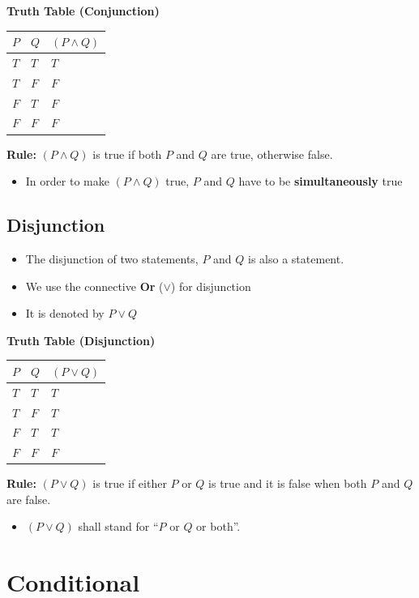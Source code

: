 \documentclass[]{book}
\providecommand{\tightlist}{%
  \setlength{\itemsep}{0pt}\setlength{\parskip}{0pt}}
\begin{document}
\textbf{Truth Table (Conjunction)}

\begin{longtable}[]{@{}lll@{}}
\toprule
\(P\) & \(Q\) & \((P \land Q)\)\tabularnewline
\midrule
\endhead
\(T\) & \(T\) & \(T\)\tabularnewline
\(T\) & \(F\) & \(F\)\tabularnewline
\(F\) & \(T\) & \(F\)\tabularnewline
\(F\) & \(F\) & \(F\)\tabularnewline
\bottomrule
\end{longtable}

\textbf{Rule:} \((P \land Q)\) is true if both \(P\) and \(Q\) are true, otherwise false.

\begin{itemize}
\tightlist
\item
  In order to make \((P \land Q)\) true, \(P\) and \(Q\) have to be \textbf{simultaneously} true
\end{itemize}

\hypertarget{disjunction}{%
\subsection{Disjunction}\label{disjunction}}

\begin{itemize}
\tightlist
\item
  The disjunction of two statements, \(P\) and \(Q\) is also a statement.
\item
  We use the connective \textbf{Or} (\(\lor\)) for disjunction
\item
  It is denoted by \(P \lor Q\)
\end{itemize}

\textbf{Truth Table (Disjunction)}

\begin{longtable}[]{@{}lll@{}}
\toprule
\(P\) & \(Q\) & \((P \lor Q)\)\tabularnewline
\midrule
\endhead
\(T\) & \(T\) & \(T\)\tabularnewline
\(T\) & \(F\) & \(T\)\tabularnewline
\(F\) & \(T\) & \(T\)\tabularnewline
\(F\) & \(F\) & \(F\)\tabularnewline
\bottomrule
\end{longtable}

\textbf{Rule:} \((P \lor Q)\) is true if either \(P\) or \(Q\) is true and it is false when both \(P\) and \(Q\) are false.

\begin{itemize}
\tightlist
\item
  \((P \lor Q)\) shall stand for ``\(P\) or \(Q\) or both''.
\end{itemize}

\hypertarget{conditional}{%
\section{Conditional}\label{conditional}}
\end{document}
